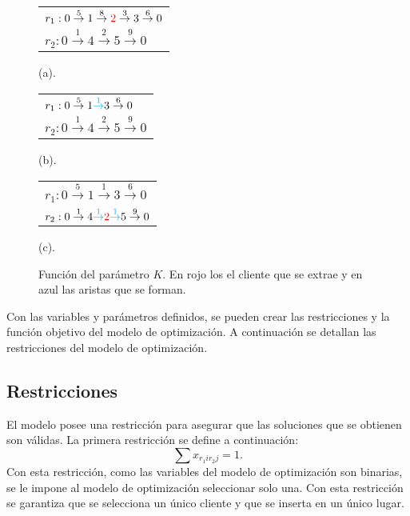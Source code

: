 \documentclass[12pt]{report}
\begin{document}
\begin{itemize}
		\begin{figure}[!h]
		\vspace{0.5em}
		\centering
		\begin{minipage}{0.45\textwidth}
			\begin{tabular}{l}
				$r_1: 0 \overset{5}{\rightarrow} 1\overset{8}{\rightarrow} \textcolor{red}{2} \overset{3}{\rightarrow} 3\overset{6}{\rightarrow} 0$\\
				$r_2: 0\overset{1}{\rightarrow} 4\overset{2}{\rightarrow} 5\overset{9}{\rightarrow} 0$
			\end{tabular}
			\caption*{(a).}
		\end{minipage}
		\begin{minipage}{0.45\textwidth}
			\begin{tabular}{l}
				$r_1: 0 \overset{5}{\rightarrow} 1 \textcolor{cyan}{\overset{1}{\rightarrow}} 3\overset{6}{\rightarrow} 0$\\
				$r_2: 0\overset{1}{\rightarrow} 4\overset{2}{\rightarrow} 5\overset{9}{\rightarrow} 0$
			\end{tabular}
			\caption*{(b).}
		\end{minipage}
		\vspace{0.5em}
		\begin{minipage}{0.45\textwidth}
			\begin{tabular}{l}
				$r_1: 0 \overset{5}{\rightarrow} 1\overset{1}{\rightarrow} 3\overset{6}{\rightarrow} 0$\\
				$r_2: 0\overset{1}{\rightarrow} 4\textcolor{cyan}{\overset{1}{\rightarrow}} \textcolor{red}{2} \textcolor{cyan}{\overset{1}{\rightarrow}} 5\overset{9}{\rightarrow} 0$
			\end{tabular}
			\caption*{(c).}
		\end{minipage}
		\caption{Función del parámetro $K$. En rojo los el cliente que se extrae y en azul las aristas que se forman.}
		\label{fig:parameter graph}
		\end{figure}
	\end{itemize}

	Con las variables y parámetros definidos, se pueden crear las restricciones y la función objetivo del modelo de optimización. A continuación se detallan las restricciones del modelo de optimización.

    \subsection{Restricciones}
    El modelo posee una restricción para asegurar que las soluciones que se obtienen son válidas. La primera restricción se define a continuación:
    \[
    \sum  x_{r_1ir_2j} = 1.
    \]
    Con esta restricción, como las variables del modelo de optimización son binarias, se le impone al modelo de optimización seleccionar solo una. Con esta restricción se garantiza que se selecciona un único cliente y que se inserta en un único lugar.
\end{document}
